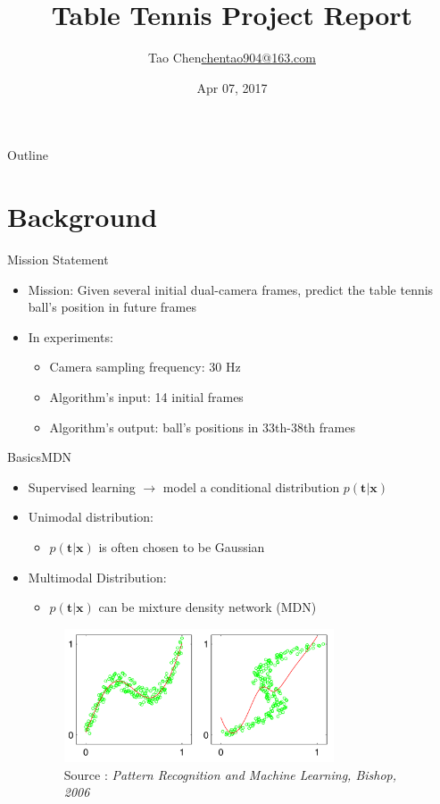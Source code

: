 \documentclass{beamer}
\title{Table Tennis Project Report}
\author{Tao Chen\newline\href{mailto:chentao904@163.com}{chentao904@163.com}}
\date{Apr 07, 2017}
\newcommand{\source}[1]{\caption*{{\color{blue}Source :} {#1}} }
\begin{document}
	\begin{frame}
		\titlepage
	\end{frame}
	
	
	\begin{frame}{Outline}
		\tableofcontents
	\end{frame}
    
    
	\section{Background}
	
	\begin{frame}{Mission Statement}
	\begin{itemize}
	\item {{\color{blue}Mission}: Given several {\color{magenta}initial dual-camera frames}, predict the table tennis {\color{magenta}ball's position} in future frames}
	\item {In experiments:}
	\begin{itemize}
	\item {Camera sampling frequency: 30 Hz}
	\item {Algorithm's input: 14 initial frames}
	\item {Algorithm's output: ball's positions in 33th-38th frames}
	\end{itemize}
	\end{itemize}
	\end{frame}
	
	\begin{frame}{Basics}{MDN}
	\begin{itemize}
	\item {Supervised learning $\rightarrow$ model a conditional distribution {\color{magenta} $p(\boldsymbol{t} | \boldsymbol{x})$}}
	\item {{\color{blue} Unimodal distribution}:}
	\begin{itemize}
	\item {$p(\boldsymbol{t} | \boldsymbol{x})$ is often chosen to be {\color{red} Gaussian}}
	\end{itemize}
	\item {{\color{blue} Multimodal Distribution}:}
	\begin{itemize}
	\item {$p(\boldsymbol{t} | \boldsymbol{x})$ can be {\color{red} mixture density network (MDN)}}
	\end{itemize}
	\begin{figure}
	\includegraphics[width=8cm]{mdn_toy.png}
	\caption{Unimodal and Multimodal}
	\source{\textit{Pattern Recognition and Machine Learning, Bishop, 2006}}
	\end{figure}	
	\end{itemize}
	\end{frame}
	
\end{document}
